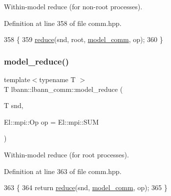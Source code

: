 Within-\/model reduce (for non-\/root processes). 

Definition at line 358 of file comm.\+hpp.


\begin{DoxyCode}
358                                                             \{
359     \hyperlink{classlbann_1_1lbann__comm_ab8a2261394c978aa7e4b74ecebc739a8}{reduce}(snd, root, \hyperlink{classlbann_1_1lbann__comm_a58a75b76bd61ec8a26c1cbbec3dc2f45}{model\_comm}, op);
360   \}
\end{DoxyCode}
\mbox{\label{classlbann_1_1lbann__comm_aac992e520cfbfb5f7b403ee6c9334b0e}} 
\subsubsection{\texorpdfstring{model\+\_\+reduce()}{model\_reduce()}\hspace{0.1cm}{\footnotesize\ttfamily [2/4]}}
{\footnotesize\ttfamily template$<$typename T $>$ \\
T lbann\+::lbann\+\_\+comm\+::model\+\_\+reduce (\begin{DoxyParamCaption}\item[{T}]{snd,  }\item[{El\+::mpi\+::\+Op}]{op = {\ttfamily El\+:\+:mpi\+:\+:SUM} }\end{DoxyParamCaption})\hspace{0.3cm}{\ttfamily [inline]}}

Within-\/model reduce (for root processes). 

Definition at line 363 of file comm.\+hpp.


\begin{DoxyCode}
363                                                \{
364     \textcolor{keywordflow}{return} \hyperlink{classlbann_1_1lbann__comm_ab8a2261394c978aa7e4b74ecebc739a8}{reduce}(snd, \hyperlink{classlbann_1_1lbann__comm_a58a75b76bd61ec8a26c1cbbec3dc2f45}{model\_comm}, op);
365   \}
\end{DoxyCode}
\mbox{\label{classlbann_1_1lbann__comm_aa605a57eb9132fc575e90b1ac825cf0b}} 
